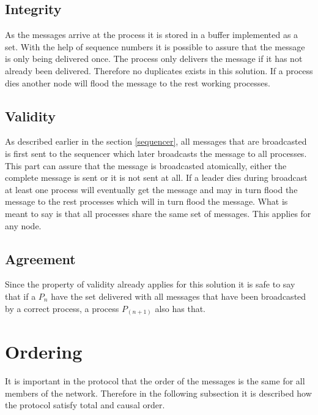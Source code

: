 \documentclass{article}
\begin{document}
\subsection{Integrity}
As the messages arrive at the process it is stored in a buffer implemented as a set. With the help of sequence numbers
it is possible to assure that the message is only being delivered once. The process only delivers the message if it
has not already been delivered. Therefore no duplicates exists in this solution. If a process dies another node will flood
the message to the rest working processes.


\subsection{Validity}
As described earlier in the section \ref{sequencer}, all messages that are broadcasted is first sent to the sequencer which
later broadcasts the message to all processes. This part can assure that the message is broadcasted atomically, either the complete
message is sent or it is not sent at all. If a leader dies during broadcast at least one process will eventually get the message and 
may in turn flood the message to the rest processes which will in turn flood the message. What is meant to say is that all processes
share the same set of messages. This applies for any node.


\subsection{Agreement}
Since the property of validity already applies for this solution it is safe to say that if a $P_n$ have the set delivered with all
messages that have been broadcasted by a correct process, a process $P_(n+1)$ also has that.

\section{Ordering}
  It is important in the protocol that the order of the messages is the same 
  for all members of the network. Therefore in the following subsection it is 
  described how the protocol satisfy total and causal order.
\end{document}

